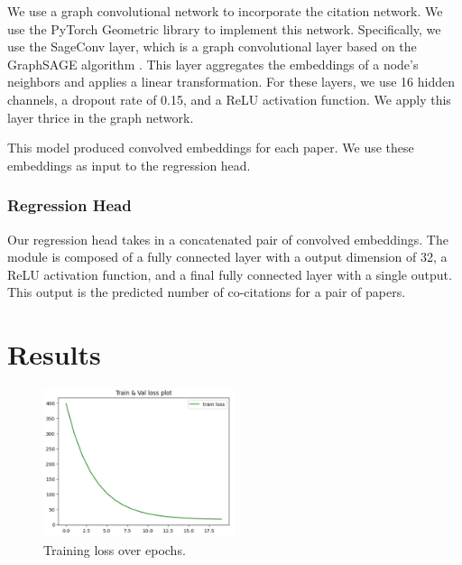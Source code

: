\documentclass[10pt,twocolumn,letterpaper]{article}
\begin{document}
We use a graph convolutional network to incorporate the citation network. We use the PyTorch Geometric library \cite{fey2019fast} to implement this network. Specifically, we use the SageConv layer, which is a graph convolutional layer based on the GraphSAGE algorithm \cite{hamilton2017inductive}. This layer aggregates the embeddings of a node's neighbors and applies a linear transformation. For these layers, we use 16 hidden channels, a dropout rate of 0.15, and a ReLU activation function. We apply this layer thrice in the graph network.

This model produced convolved embeddings for each paper. We use these embeddings as input to the regression head.

\subsubsection{Regression Head}

Our regression head takes in a concatenated pair of convolved embeddings.
The module is composed of a fully connected layer with a output dimension of 32, a ReLU activation function, and a final fully connected layer with a single output. This output is the predicted number of co-citations for a pair of papers.


\section{Results}


\begin{figure}
      \centering
      \includegraphics[width=0.5\textwidth]{figures/train-loss.jpeg}
      \caption{Training loss over epochs.}
      \label{fig:train_loss}
\end{figure}
\end{document}
